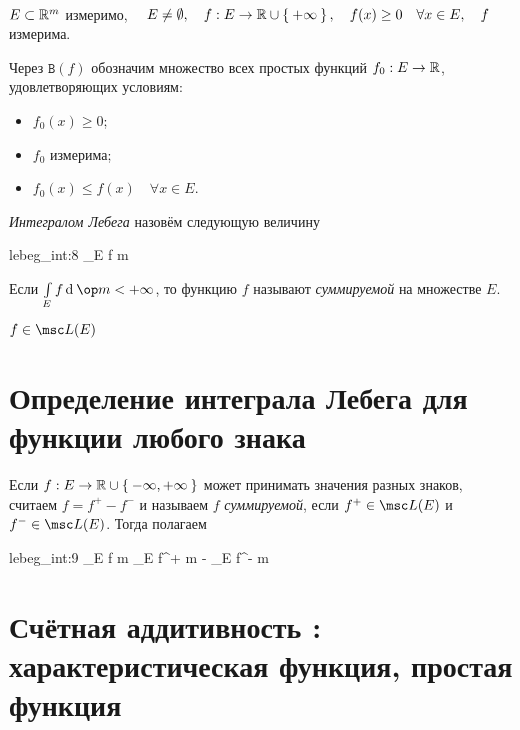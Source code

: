 \begin{definition}\hfill \\
	$ E \subset \mathbb{R}^m $ измеримо, $ \quad E \ne \emptyset, \quad f : E \to \mathbb{R} \cup \Set{+\infty}, \quad f(x) \ge 0 \quad \forall x \in E, \quad f $ измерима.

	Через $ \mathtt B(f) $ обозначим множество всех простых функций $ f_0 : E \to \mathbb{R} $, удовлетворяющих условиям:
	\begin{itemize}
		\item $ f_0(x) \ge 0 $;
		\item $ f_0 $ измерима;
		\item $ f_0(x) \le f(x) \quad \forall x \in E $.
	\end{itemize}

	\emph{Интегралом Лебега} назовём следующую величину
	\begin{equ}{lebeg_int:8}
		\int\limits_E f \di \op m \coloneq \sup {}
	\end{equ}
\end{definition}

\begin{definition}
	Если $ \int\limits_E f \di \op m < +\infty $, то функцию $ f $ называют \emph{суммируемой} на множестве $ E $.
\end{definition}

\begin{notation}
	$ f \in \msc L(E) $
\end{notation}

\section{Определение интеграла Лебега для функции любого знака}

\begin{definition}
	Если $ f : E \to \mathbb{R} \cup \Set{-\infty, +\infty} $ может принимать значения разных знаков, считаем $ f = f^+ - f^- $ и называем $ f $ \emph{суммируемой}, если $ f^+ \in \msc L(E) $ и $ f^- \in \msc L(E) $.
	Тогда полагаем
	\begin{equ}{lebeg_int:9}
		\int\limits_E f \di \op m \coloneq \int\limits_E f^+ \di \op m - \int\limits_E f^- \di \op m
	\end{equ}
\end{definition}

\section{Счётная аддитивность : характеристическая функция, простая функция }


